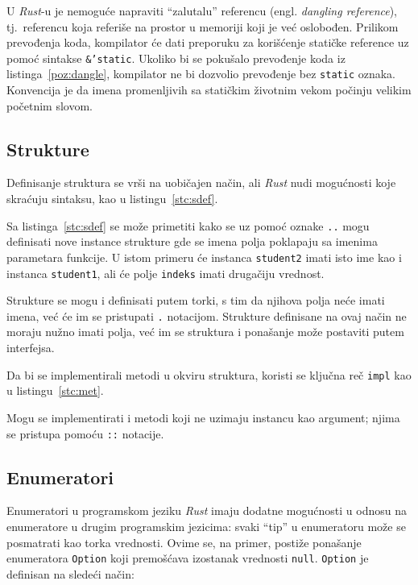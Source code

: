 \documentclass[12pt,oneside]{memoir}
\begin{document}
U \emph{Rust}-u je nemoguće napraviti ``zalutalu'' referencu (engl. \emph{dangling reference}),
tj.\ referencu koja referiše na prostor u memoriji koji je već oslobođen. Prilikom prevođenja
koda, kompilator će dati preporuku za korišćenje statičke reference uz pomoć sintakse
\texttt{\&'static}. Ukoliko bi se pokušalo prevođenje koda iz listinga~\ref{poz:dangle},
kompilator ne bi dozvolio prevođenje bez \texttt{static} oznaka. Konvencija je da imena
promenljivih sa statičkim životnim vekom počinju velikim početnim slovom.



\subsection{Strukture}
Definisanje struktura se vrši na uobičajen način, ali \emph{Rust} nudi mogućnosti koje skraćuju
sintaksu, kao u listingu~\ref{stc:sdef}.



Sa listinga~\ref{stc:sdef} se može primetiti kako se uz pomoć oznake \texttt{..} mogu definisati
nove instance strukture gde se imena
polja poklapaju sa imenima parametara funkcije. U istom primeru će instanca \texttt{student2}
imati isto ime kao i instanca \texttt{student1}, ali će polje \texttt{indeks} imati
drugačiju vrednost.

Strukture se mogu i definisati putem torki, s tim da njihova polja neće imati imena, već će
im se pristupati \texttt{.} notacijom. Strukture definisane na ovaj način ne moraju nužno imati
polja, već im se struktura i ponašanje može postaviti putem interfejsa.

Da bi se implementirali metodi u okviru struktura, koristi se ključna reč \texttt{impl} kao u
listingu~\ref{stc:met}.



\noindent
Mogu se implementirati i metodi koji ne uzimaju instancu kao argument; njima se pristupa pomoću
\texttt{::} notacije.

\subsection{Enumeratori}\label{subsec:enum}
Enumeratori u programskom jeziku \emph{Rust} imaju dodatne mogućnosti u odnosu na enumeratore u
drugim programskim jezicima: svaki ``tip'' u enumeratoru može se posmatrati kao torka vrednosti.
Ovime se, na primer, postiže ponašanje enumeratora \texttt{Option} koji premošćava izostanak vrednosti
\texttt{null}. \texttt{Option} je definisan na sledeći način:
\end{document}
